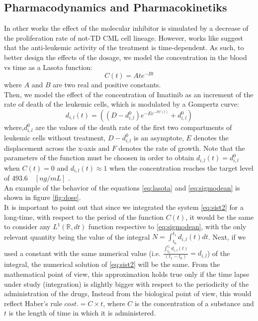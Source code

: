 \documentclass[a4paper,10pt]{article}
\begin{document}
\subsection{Pharmacodynamics and Pharmacokinetiks}
In other works \cite{michor2005} the effect of the molecular inhibitor is simulated by 
a decrease of the proliferation rate of not-TD CML cell lineage.
However, works like \cite{pk-imatinib-1, pk-imatinib-2, pk-imatinib-3}
suggest that the anti-leukemic 
activity of the treatment is time-dependent. 
As such, to better design the effects of the dosage, we model the concentration in the blood vs
time as a Lasota
\cite{wazewska1976matematyczne} function:
\begin{equation}
C(t)=A t e^{-Bt}
\label{eq:lasota}
\end{equation}
where $A$ and $B$ are two real and positive constants.\\
Then, we model the effect of the concentration of Imatinib as an increment 
of the rate of death \cite{effetto-imatinib-1, effetto-imatinib-2, effetto-imatinib-3} 
of the leukemic cells,
which is modulated by a Gompertz curve:
\begin{equation}
d_{i,l}(t)= \left((D-d_{i,l}^0) e^{-E e^{-F C(t)}} +d_{i,l}^0 \right)
\label{eq:sigmodean}
\end{equation}
where,$d_{i,l}^0$ are the values of the death rate of the first
two compartments of leukemic cells without treatment, 
$D-d_{i,l}^0$ is an asymptote, 
$E$ denotes the displacement across the x-axis and $F$  denotes the rate of growth.
Note that the parameters of the function must be choosen
in order to obtain $d_{i,l}(t)=d_{i,l}^0$ when $C(t)=0$ and $d_{i,l}(t)\approx 1$
when the concentration reaches the target level of $493.6\quad [ng/mL]$ \cite{druker1996effects, buchdunger1996inhibition}.\\
An example of the behavior of the equations \eqref{eq:lasota} and \eqref{eq:sigmodean} 
is shown in figure \ref{fig:dose}.\\
It is important to point out that
since we integrated the system \ref{eq:sist2} for a long-time, with respect
to the period of the function $C(t)$,
it would be the same to consider any $L^1(\mathbb{R},dt)$ 
function respective to \eqref{eq:sigmodean},
with the only relevant quantity being the value of the integral
$N= \int_{t_0}^{t_1} d_{i,l}(t) dt$.
Next, if we used a constant with the same numerical value 
(i.e. $ \frac{\int_{t_0}^{t_1}d_{i,l}(t)}{(t_1-t_0)}=d_{i,l} $) 
of the integral, 
the numerical solution of \eqref{eq:sist2} will be the same.
From the mathematical point of view,
this approximation holds true only if the time lapse under study (integration) is 
slightly bigger with respect to the periodicity of the 
administration of the drugs,
Instead from the biological point of view, 
this would reflect  Haber's rule \cite{miller2000haber}
$cost.= C\times t$, where $C$ is the concentration of a substance 
and $t$ is the length of time in which it is administered.\\
\end{document}
